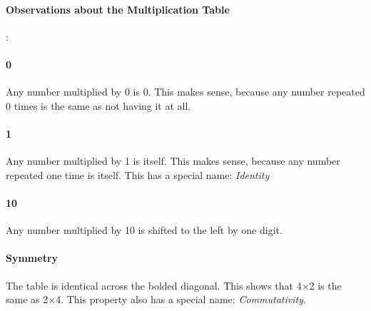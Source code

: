 \paragraph{Observations about the Multiplication Table}:
\linebreak
\paragraph{0} Any number multiplied by 0 is 0. This makes sense, because any number
repeated 0 times is the same as not having it at all.
\paragraph{1} Any number multiplied by 1 is itself. This makes sense, because any
number repeated one time is itself. This has a special name: \textit{Identity}
\paragraph{10} Any number multiplied by 10 is shifted to the left by one digit.
\paragraph{Symmetry} The table is identical across the bolded diagonal. This shows
that 4×2 is the same as 2×4. This property also has a special name:
\textit{Commutativity}.
